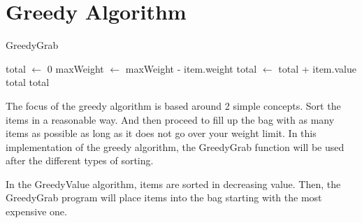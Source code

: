 \documentclass[10pt, letterpaper]{article}
\begin{document}
\section{Greedy Algorithm}

\begin{algorithm}[!htp]
  \begin{algorithmic}
    \caption{GreedyGrab}\label{GreedyGrab}
    \State total $\gets$ 0
    \State maxWeight $\gets$ maxWeight - item.weight
    \State total $\gets$ total + item.value
    \EndIf
    \Return total
    \EndIf
    \EndFor
    \Return total
    \EndFunction
  \end{algorithmic}
\end{algorithm}

The focus of the greedy algorithm is based around 2 simple concepts. Sort the items in a reasonable way. And then proceed to fill up the bag with as many items as possible as long as it does not go over your weight limit. In this implementation of the greedy algorithm, the GreedyGrab function will be used after the different types of sorting.

In the GreedyValue algorithm, items are sorted in decreasing value. Then, the GreedyGrab program will place items into the bag starting with the most expensive one.

\end{document}
